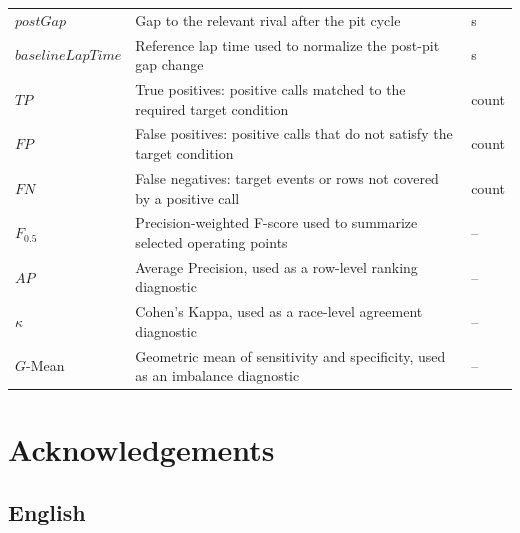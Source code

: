 \documentclass{Configuration_Files/PoliMi3i_thesis}
\begin{document}
\begin{longtable}{p{}p{}p{}}
    $postGap$          & Gap to the relevant rival after the pit cycle                                                         & s             \\

    $baselineLapTime$  & Reference lap time used to normalize the post-pit gap change                                          & s             \\

    $TP$               & True positives: positive calls matched to the required target condition                               & count         \\

    $FP$               & False positives: positive calls that do not satisfy the target condition                              & count         \\

    $FN$               & False negatives: target events or rows not covered by a positive call                                 & count         \\

    $F_{0.5}$          & Precision-weighted F-score used to summarize selected operating points                                & --            \\

    $AP$               & Average Precision, used as a row-level ranking diagnostic                                             & --            \\

    $\kappa$           & Cohen's Kappa, used as a race-level agreement diagnostic                                              & --            \\

    $G$-Mean           & Geometric mean of sensitivity and specificity, used as an imbalance diagnostic                        & --            \\
\end{longtable}


\chapter*{Acknowledgements}

\begingroup
\renewcommand{\thesection}{\arabic{section}}
\setcounter{section}{0}

\section{English}
\end{document}
